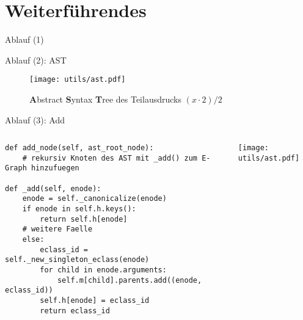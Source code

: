 \EnableTitleSlide
\section{Weiterführendes}

   

\begin{frame}{Ablauf (1)}
    \begin{tcbitemize}[raster equal height=rows, raster columns=3, raster column skip = 1.5cm,
        raster every box/.style={size=small,valign=center,halign=center,colframe=white,colback=white}]
        \tcbitem {}
    \end{tcbitemize}\vspace{5mm}
\end{frame}

\begin{frame}{Ablauf (2): AST}
    \begin{figure}[H]
        \centering
        \texttt{[image: utils/ast.pdf]}
        \caption{\textbf{A}bstract \textbf{S}yntax \textbf{T}ree des Teilausdrucks $(x \cdot 2) / 2$}
        \label{fig:komponenten}
    \end{figure}
\end{frame}

\begin{frame}[fragile]{Ablauf (3): Add}
    \begin{columns}[c]
\begin{verbatim}    
def add_node(self, ast_root_node): 
    # rekursiv Knoten des AST mit _add() zum E-Graph hinzufuegen 

def _add(self, enode): 
    enode = self._canonicalize(enode)
    if enode in self.h.keys(): 
        return self.h[enode]
    # weitere Faelle 
    else:
        eclass_id = self._new_singleton_eclass(enode)
        for child in enode.arguments:
            self.m[child].parents.add((enode, eclass_id)) 
        self.h[enode] = eclass_id
        return eclass_id
\end{verbatim}
            \texttt{[image: utils/ast.pdf]}
    \end{columns}
\end{frame}

